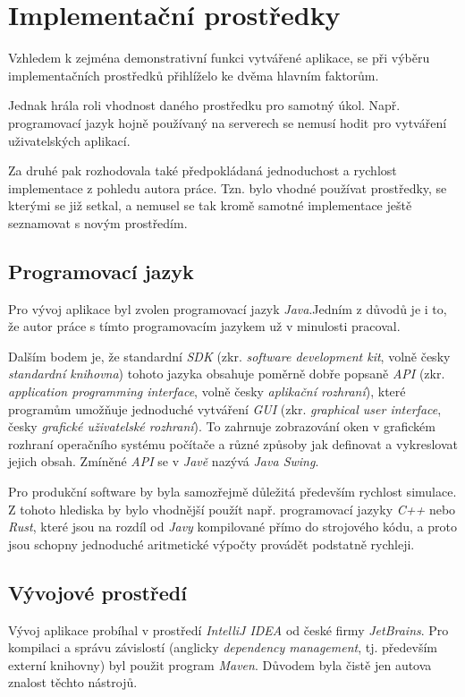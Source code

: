 \section{Implementační prostředky}

Vzhledem k zejména demonstrativní funkci vytvářené aplikace, se při výběru implementačních prostředků přihlíželo ke dvěma hlavním faktorům.

Jednak hrála roli vhodnost daného prostředku pro samotný úkol. Např. programovací jazyk hojně používaný na serverech se nemusí hodit pro vytváření uživatelských aplikací.

Za druhé pak rozhodovala také předpokládaná jednoduchost a rychlost implementace z pohledu autora práce. Tzn. bylo vhodné používat prostředky, se kterými se již setkal, a nemusel se tak kromě samotné implementace ještě seznamovat s novým prostředím.

\subsection{Programovací jazyk}

Pro vývoj aplikace byl zvolen programovací jazyk \emph{Java}.\src Jedním z důvodů je i to, že autor práce s tímto programovacím jazykem už v minulosti pracoval.

Dalším bodem je, že standardní \emph{SDK} (zkr. \emph{software development kit}, volně česky \emph{standardní knihovna}) tohoto jazyka obsahuje poměrně dobře popsaně \emph{API} (zkr. \emph{application programming interface}, volně česky \emph{aplikační rozhraní}), které programům umožňuje jednoduché vytváření \emph{GUI} (zkr. \emph{graphical user interface}, česky \emph{grafické uživatelské rozhraní}). To zahrnuje zobrazování oken v grafickém rozhraní operačního systému počítače a různé způsoby jak definovat a vykreslovat jejich obsah. Zmíněné \emph{API} se v \emph{Javě} nazývá \emph{Java Swing}.\src

Pro produkční software by byla samozřejmě důležitá především rychlost simulace. Z tohoto hlediska by bylo vhodnější použít např. programovací jazyky \emph{C++} nebo \emph{Rust}, které jsou na rozdíl od \emph{Javy} kompilované přímo do strojového kódu, a proto jsou schopny jednoduché aritmetické výpočty provádět podstatně rychleji.

\subsection{Vývojové prostředí}

Vývoj aplikace probíhal v prostředí \emph{IntelliJ IDEA} od české firmy \emph{JetBrains}. Pro kompilaci a správu závislostí (anglicky \emph{dependency management}, tj. především externí knihovny) byl použit program \emph{Maven}. Důvodem byla čistě jen autova znalost těchto nástrojů. 
